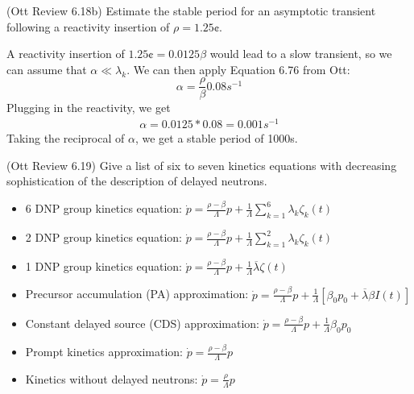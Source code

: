 \documentclass[11pt,addpoints,answers]{exam}
\begin{document}
\begin{questions}
        
        \question[10] (Ott Review 6.18b) Estimate the stable period for an 
        asymptotic transient following a reactivity insertion of $\rho = 
        1.25\cent$.
        \begin{solution}
            A reactivity insertion of $1.25\cent = 0.0125\beta$ would lead to a slow
            transient, so we can assume that $\alpha \ll \lambda_{k}$. We can
            then apply Equation 6.76 from Ott:
            \begin{equation*}
                \alpha = \frac{\rho}{\beta} 0.08 s^{-1}
            \end{equation*}
            Plugging in the reactivity, we get
            \begin{align*}
                \alpha = 0.0125 * 0.08 = 0.001 s^{-1}
            \end{align*}
            Taking the reciprocal of $\alpha$, we get a stable period of 1000s.
        \end{solution}


        \question[10] (Ott Review 6.19) Give a list of six to seven 
        kinetics equations with decreasing sophistication of the description of 
        delayed neutrons.
        \begin{solution}
        \begin{itemize}
            \item 6 DNP group kinetics equation: $\dot{p} = \frac{\rho -
                \beta}{\Lambda}p + \frac{1}{\Lambda} \sum_{k=1}^{6} \lambda_{k}
                \zeta_{k}(t)$
            \item 2 DNP group kinetics equation: $\dot{p} = \frac{\rho -
                \beta}{\Lambda}p + \frac{1}{\Lambda} \sum_{k=1}^{2} \lambda_{k}
                \zeta_{k}(t)$ 
            \item 1 DNP group kinetics equation: $\dot{p} = \frac{\rho -
                    \beta}{\Lambda}p + \frac{1}{\Lambda} \overline{\lambda}
                \zeta(t)$ 
            \item Precursor accumulation (PA) approximation: $\dot{p} = \frac{\rho -
                \beta}{\Lambda}p + \frac{1}{\Lambda} [\beta_{0}p_{0} + \overline{\lambda}
                \beta I(t)]$
            \item Constant delayed source (CDS) approximation: $\dot{p} = \frac{\rho -
                \beta}{\Lambda}p + \frac{1}{\Lambda} \beta_{0}p_{0}$
            \item Prompt kinetics approximation: $\dot{p} = \frac{\rho -
                \beta}{\Lambda}p$
            \item Kinetics without delayed neutrons: $\dot{p} = \frac{\rho}{\Lambda}p$
        \end{itemize}
        \end{solution}


\end{questions}
\end{document}
